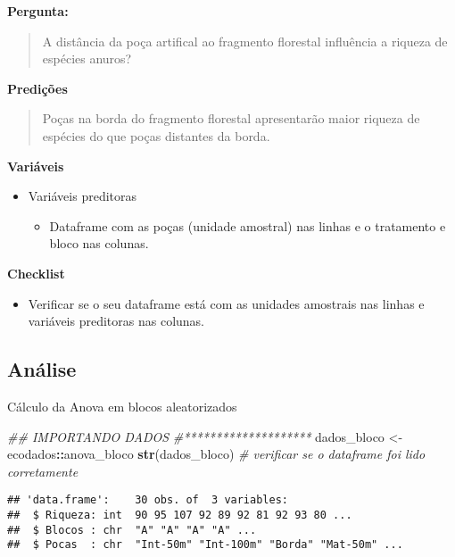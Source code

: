 \documentclass[
]{book}
\newenvironment{Shaded}{\begin{snugshade}}{\end{snugshade}}
\newcommand{\CommentTok}[1]{\textcolor[rgb]{0.56,0.35,0.01}{\textit{#1}}}
\newcommand{\KeywordTok}[1]{\textcolor[rgb]{0.13,0.29,0.53}{\textbf{#1}}}
\newcommand{\NormalTok}[1]{#1}
\newcommand{\OperatorTok}[1]{\textcolor[rgb]{0.81,0.36,0.00}{\textbf{#1}}}
\newcommand{\StringTok}[1]{\textcolor[rgb]{0.31,0.60,0.02}{#1}}
\providecommand{\tightlist}{%
  \setlength{\itemsep}{0pt}\setlength{\parskip}{0pt}}
\begin{document}
\textbf{Pergunta:}

\begin{quote}
A distância da poça artifical ao fragmento florestal influência a riqueza de espécies anuros?
\end{quote}

\textbf{Predições}

\begin{quote}
Poças na borda do fragmento florestal apresentarão maior riqueza de espécies do que poças distantes da borda.
\end{quote}

\textbf{Variáveis}

\begin{itemize}
\tightlist
\item
  Variáveis preditoras

  \begin{itemize}
  \tightlist
  \item
    Dataframe com as poças (unidade amostral) nas linhas e o tratamento e bloco nas colunas.
  \end{itemize}
\end{itemize}

\textbf{Checklist}

\begin{itemize}
\tightlist
\item
  Verificar se o seu dataframe está com as unidades amostrais nas linhas e variáveis preditoras nas colunas.
\end{itemize}

\hypertarget{anuxe1lise-8}{%
\subsection{Análise}\label{anuxe1lise-8}}

Cálculo da Anova em blocos aleatorizados

\begin{Shaded}
\begin{Highlighting}[]
\CommentTok{## IMPORTANDO DADOS}
\CommentTok{#********************}
\NormalTok{dados_bloco <-}\StringTok{ }\NormalTok{ecodados}\OperatorTok{::}\NormalTok{anova_bloco}
\KeywordTok{str}\NormalTok{(dados_bloco) }\CommentTok{# verificar se o dataframe foi lido corretamente}
\end{Highlighting}
\end{Shaded}

\begin{verbatim}
## 'data.frame':	30 obs. of  3 variables:
##  $ Riqueza: int  90 95 107 92 89 92 81 92 93 80 ...
##  $ Blocos : chr  "A" "A" "A" "A" ...
##  $ Pocas  : chr  "Int-50m" "Int-100m" "Borda" "Mat-50m" ...
\end{verbatim}
\end{document}
